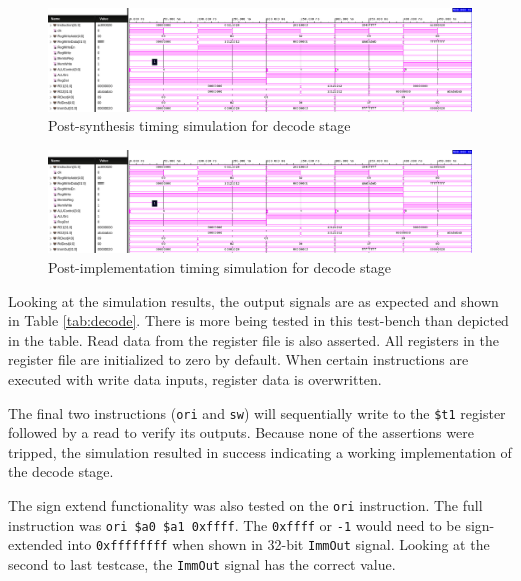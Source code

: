\documentclass[CMPE]{../KGCOEReport}
\def\code#1{\texttt{#1}}
\begin{document}
    \begin{figure}[h!]
        \centering
        \includegraphics[width=\textwidth]{img/synthesis_decode}
        \caption{Post-synthesis timing simulation for decode stage}
        \label{fig:synth_decode}
    \end{figure}

    \begin{figure}[h!]
        \centering
        \includegraphics[width=\textwidth]{img/synthesis_decode}
        \caption{Post-implementation timing simulation for decode stage}
        \label{fig:impl_decode}
    \end{figure}

    
    \pagebreak
    
    Looking at the simulation results, the output signals are as expected and
    shown in Table \ref{tab:decode}. There is more being tested in this
    test-bench than depicted in the table. Read data from the register
    file is also asserted. All registers in the register file are initialized
    to zero by default. When certain instructions are executed with
    write data inputs, register data is overwritten.
    
    The final two instructions (\code{ori} and \code{sw}) will sequentially
    write to the \code {\$t1} register followed by a read to verify its outputs.
    Because none of the assertions were tripped, the simulation resulted in
    success indicating a working implementation of the decode stage.
    
    The sign extend functionality was also tested on the \code{ori} instruction.
    The full instruction was \code{ori \$a0 \$a1 0xffff}. The \code{0xffff}
    or \code{-1} would need to be sign-extended into \code{0xffffffff}
    when shown in 32-bit \code{ImmOut} signal. Looking at the second to 
    last testcase, the \code{ImmOut} signal has the correct value. 
\end{document}
